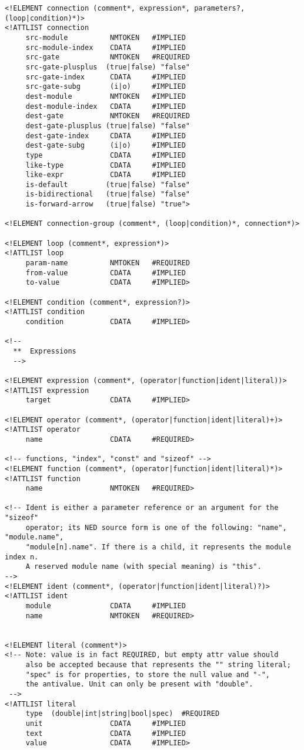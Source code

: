 \begin{verbatim}
<!ELEMENT connection (comment*, expression*, parameters?, (loop|condition)*)>
<!ATTLIST connection
     src-module          NMTOKEN   #IMPLIED
     src-module-index    CDATA     #IMPLIED
     src-gate            NMTOKEN   #REQUIRED
     src-gate-plusplus  (true|false) "false"
     src-gate-index      CDATA     #IMPLIED
     src-gate-subg       (i|o)     #IMPLIED
     dest-module         NMTOKEN   #IMPLIED
     dest-module-index   CDATA     #IMPLIED
     dest-gate           NMTOKEN   #REQUIRED
     dest-gate-plusplus (true|false) "false"
     dest-gate-index     CDATA     #IMPLIED
     dest-gate-subg      (i|o)     #IMPLIED
     type                CDATA     #IMPLIED
     like-type           CDATA     #IMPLIED
     like-expr           CDATA     #IMPLIED
     is-default         (true|false) "false"
     is-bidirectional   (true|false) "false"
     is-forward-arrow   (true|false) "true">

<!ELEMENT connection-group (comment*, (loop|condition)*, connection*)>

<!ELEMENT loop (comment*, expression*)>
<!ATTLIST loop
     param-name          NMTOKEN   #REQUIRED
     from-value          CDATA     #IMPLIED
     to-value            CDATA     #IMPLIED>

<!ELEMENT condition (comment*, expression?)>
<!ATTLIST condition
     condition           CDATA     #IMPLIED>

<!--
  **  Expressions
  -->

<!ELEMENT expression (comment*, (operator|function|ident|literal))>
<!ATTLIST expression
     target              CDATA     #IMPLIED>

<!ELEMENT operator (comment*, (operator|function|ident|literal)+)>
<!ATTLIST operator
     name                CDATA     #REQUIRED>

<!-- functions, "index", "const" and "sizeof" -->
<!ELEMENT function (comment*, (operator|function|ident|literal)*)>
<!ATTLIST function
     name                NMTOKEN   #REQUIRED>

<!-- Ident is either a parameter reference or an argument for the "sizeof"
     operator; its NED source form is one of the following: "name", "module.name",
     "module[n].name". If there is a child, it represents the module index n.
     A reserved module name (with special meaning) is "this".
-->
<!ELEMENT ident (comment*, (operator|function|ident|literal)?)>
<!ATTLIST ident
     module              CDATA     #IMPLIED
     name                NMTOKEN   #REQUIRED>


<!ELEMENT literal (comment*)>
<!-- Note: value is in fact REQUIRED, but empty attr value should
     also be accepted because that represents the "" string literal;
     "spec" is for properties, to store the null value and "-",
     the antivalue. Unit can only be present with "double".
 -->
<!ATTLIST literal
     type  (double|int|string|bool|spec)  #REQUIRED
     unit                CDATA     #IMPLIED
     text                CDATA     #IMPLIED
     value               CDATA     #IMPLIED>


\end{verbatim}

